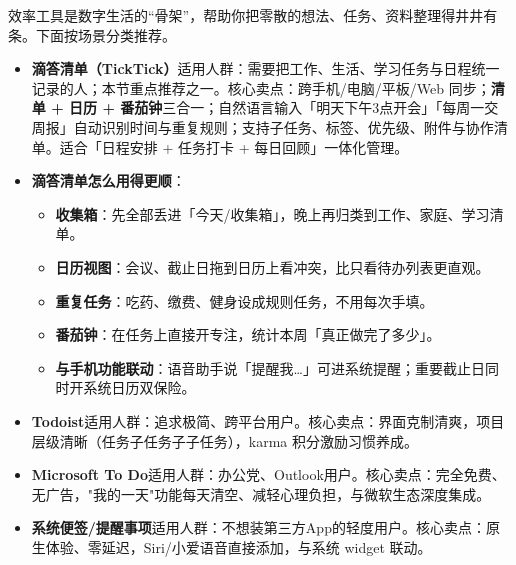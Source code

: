 


效率工具是数字生活的“骨架”，帮助你把零散的想法、任务、资料整理得井井有条。下面按场景分类推荐。


\begin{itemize}
  \item \textbf{滴答清单（TickTick）}适用人群：需要把工作、生活、学习任务与日程统一记录的人；本节重点推荐之一。核心卖点：跨手机/电脑/平板/Web 同步；\textbf{清单 + 日历 + 番茄钟}三合一；自然语言输入「明天下午3点开会」「每周一交周报」自动识别时间与重复规则；支持子任务、标签、优先级、附件与协作清单。适合「日程安排 + 任务打卡 + 每日回顾」一体化管理。
  \item \textbf{滴答清单怎么用得更顺}：
  \begin{itemize}
    \item \textbf{收集箱}：先全部丢进「今天/收集箱」，晚上再归类到工作、家庭、学习清单。
    \item \textbf{日历视图}：会议、截止日拖到日历上看冲突，比只看待办列表更直观。
    \item \textbf{重复任务}：吃药、缴费、健身设成规则任务，不用每次手填。
    \item \textbf{番茄钟}：在任务上直接开专注，统计本周「真正做完了多少」。
    \item \textbf{与手机功能联动}：语音助手说「提醒我…」可进系统提醒；重要截止日同时开系统日历双保险。
  \end{itemize}
  \item \textbf{Todoist}适用人群：追求极简、跨平台用户。核心卖点：界面克制清爽，项目层级清晰（任务子任务子子任务），karma 积分激励习惯养成。
  \item \textbf{Microsoft To Do}适用人群：办公党、Outlook用户。核心卖点：完全免费、无广告，"我的一天"功能每天清空、减轻心理负担，与微软生态深度集成。
  \item \textbf{系统便签/提醒事项}适用人群：不想装第三方App的轻度用户。核心卖点：原生体验、零延迟，Siri/小爱语音直接添加，与系统 widget 联动。
\end{itemize}

